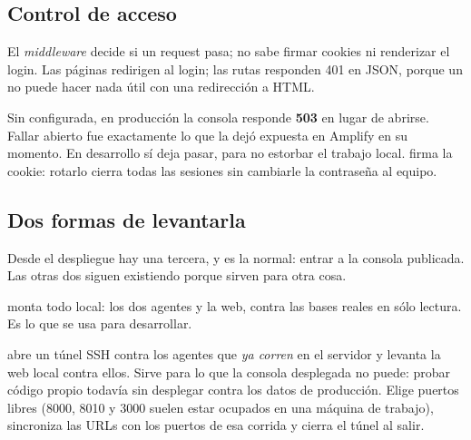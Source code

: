 \subsection{Control de acceso}

El \emph{middleware} decide si un request pasa; no sabe firmar cookies ni renderizar el
login. Las páginas redirigen al login; las rutas  responden 401 en JSON,
porque un  no puede hacer nada útil con una redirección a HTML.

\begin{aviso}[title=Fallar cerrado]
Sin  configurada, en producción la consola responde \textbf{503}
en lugar de abrirse. Fallar abierto fue exactamente lo que la dejó expuesta en Amplify
en su momento. En desarrollo sí deja pasar, para no estorbar el trabajo local.
 firma la cookie: rotarlo cierra todas las sesiones sin
cambiarle la contraseña al equipo.
\end{aviso}

\subsection{Dos formas de levantarla}

Desde el despliegue hay una tercera, y es la normal: entrar a la consola publicada.
Las otras dos siguen existiendo porque sirven para otra cosa.

 monta todo local: los dos agentes y la web, contra las bases reales en
sólo lectura. Es lo que se usa para desarrollar.

 abre un túnel SSH contra los agentes que \emph{ya corren} en el
servidor y levanta la web local contra ellos. Sirve para lo que la consola desplegada no
puede: probar código propio todavía sin desplegar contra los datos de producción. Elige
puertos libres (8000, 8010 y 3000 suelen estar ocupados en una máquina de trabajo),
sincroniza las URLs con los puertos de esa corrida y cierra el túnel al salir.
